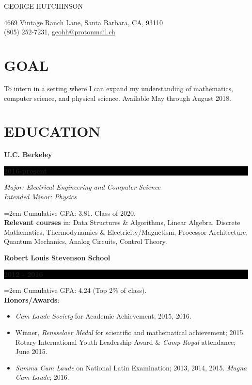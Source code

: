 \documentclass[paper=a4,fontsize=11pt]{scrartcl} %
\newlength{\spacebox}
\newcommand{\sepspace}{\vspace*{0.5em}}		%
\newcommand{\MyName}[1]{ %
		\Huge \usefont{OT1}{phv}{b}{n} \hfill #1
		\par \normalsize \normalfont}
\newcommand{\MyContact}[1]{ %
		\large \usefont{OT1}{phv}{m}{n}\hfill #1
		\par \normalsize \normalfont}
\newcommand{\NewPart}[1]{\section*{\uppercase{#1}}}
\newcommand{\PersonalEntry}[2]{
		\noindent\hangindent=2em\hangafter=0 %
		\parbox{\spacebox}{        %
		\textit{#1}}		       %
		\hspace{1.5em} #2 \par}    %
\newcommand{\EducationEntry}[4]{
		\noindent \textbf{#1} \hfill      %
		\colorbox{Black}{%
			\parbox{6.5em}{%
			\hfill\color{White}\textbf{#2}}} \par  %
		\noindent \textit{#3} \par        %
		\noindent\hangindent=2em\hangafter=0 \small #4 %
		\normalsize \par}
\newcommand{\EducationEntryNoSubtitle}[3]{
	\noindent \textbf{#1} \hfill      %
	\colorbox{Black}{%
		\parbox{6em}{%
			\hfill\color{White}\textbf{#2}}} \par %
	\noindent\hangindent=2em\hangafter=0 \small #3 %
	\normalsize \par}
\begin{document}

\MyName{GEORGE HUTCHINSON}
\MyContact{4669 Vintage Ranch Lane, Santa Barbara, CA, 93110\\\hspace*{\fill}(805) 252-7231, \url{geohh@protonmail.ch}}
\vspace*{-2em}

%

\label{GOAL}
\NewPart{Goal}

To intern in a setting where I can expand my understanding of mathematics, computer science, and physical science.
Available May through August 2018.
\vspace{-1em}

\label{EDU}
\NewPart{Education}{}

\EducationEntry{U.C. Berkeley}{2016-present}{Major: Electrical Engineering and Computer Science\\Intended Minor: Physics}{Cumulative GPA: 3.81. Class of 2020.\\\textbf{Relevant courses} in: Data Structures \& Algorithms, Linear Algebra, Discrete Mathematics, Thermodynamics \& Electricity/Magnetism, Processor Architecture, Quantum Mechanics, Analog Circuits, Control Theory.}
\sepspace

\EducationEntryNoSubtitle{Robert Louis Stevenson School}{2012 - 2016}{Cumulative GPA: 4.24 (Top 2\% of class).\\\textbf{Honors/Awards}:\begin{itemize}\setlength\itemsep{0em}
		\item\textit{Cum Laude Society} for Academic Achievement; 2015, 2016.
		\item Winner, \textit{Rensselaer Medal} for scientific and mathematical achievement; 2015.
		\indent Rotary International Youth Leadership Award \& \textit{Camp Royal} attendance; June 2015.
		\item \textit{Summa Cum Laude} on National Latin Examination; 2013, 2014, 2015. \textit{Magna Cum Laude}; 2016.\end{itemize}
}
\vspace{-1.5em}
\end{document}
